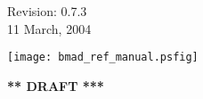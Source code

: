 \thispagestyle{empty}

\begin{flushright}
\large
  Revision: 0.7.3 \\
  11 March, 2004 \\
\end{flushright}

\vfill

{
\begin{center}
\texttt{[image: bmad\_ref\_manual.psfig]} \\
\end{center}
}

\vskip 1in
\begin{center}
{\Huge \bf *** DRAFT ***}
\end{center}
\vfill
\break